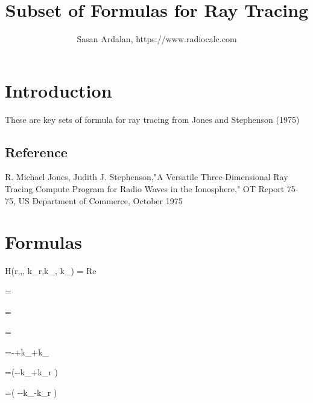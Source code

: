 \documentclass[11pt]{article} %
\title{Subset of Formulas for Ray Tracing }
\author{Sasan Ardalan, https://www.radiocalc.com }
\begin{document}
\maketitle

\section{Introduction}

These are key sets of formula for ray tracing from Jones and Stephenson (1975)

                                          
\subsection{Reference}

R. Michael Jones, Judith J. 
  Stephenson,"A Versatile Three-Dimensional  Ray Tracing 
Compute Program for Radio Waves in the Ionosphere,"             
 OT Report 75-75, US Department of Commerce,  October 1975       

\section{Formulas}

\equation
H(r,\theta,\varphi, k_r,k_\theta, k_\varphi) = Re 
\endequation


\equation
{}=
\endequation

\equation
{}=
\endequation


\equation
{}=
\endequation

\equation
{}=-+k_\theta{}+k_\varphi\sin\theta{}
\endequation


\equation
{}=(--k_\theta{}+k_\varphi r \cos \theta{})
\endequation


\equation
 =( --k_\varphi\sin \theta {}-k_\varphi r \cos \theta {})
\endequation
\end{document}
